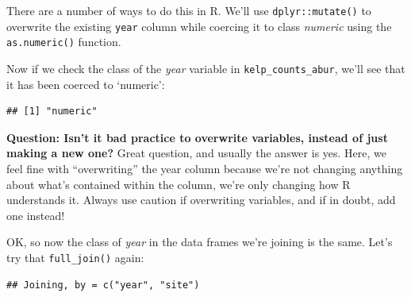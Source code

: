 \documentclass[]{book}
\newenvironment{Shaded}{\begin{snugshade}}{\end{snugshade}}
\newcommand{\CommentTok}[1]{\textcolor[rgb]{0.56,0.35,0.01}{\textit{#1}}}
\newcommand{\DataTypeTok}[1]{\textcolor[rgb]{0.13,0.29,0.53}{#1}}
\newcommand{\KeywordTok}[1]{\textcolor[rgb]{0.13,0.29,0.53}{\textbf{#1}}}
\newcommand{\NormalTok}[1]{#1}
\newcommand{\OperatorTok}[1]{\textcolor[rgb]{0.81,0.36,0.00}{\textbf{#1}}}
\newcommand{\StringTok}[1]{\textcolor[rgb]{0.31,0.60,0.02}{#1}}
\begin{document}
There are a number of ways to do this in R. We'll use \texttt{dplyr::mutate()} to overwrite the existing \texttt{year} column while coercing it to class \emph{numeric} using the \texttt{as.numeric()} function.

\begin{Shaded}
\end{Shaded}

Now if we check the class of the \emph{year} variable in \texttt{kelp\_counts\_abur}, we'll see that it has been coerced to `numeric':

\begin{Shaded}
\end{Shaded}

\begin{verbatim}
## [1] "numeric"
\end{verbatim}

\textbf{Question: Isn't it bad practice to overwrite variables, instead of just making a new one?} Great question, and usually the answer is yes. Here, we feel fine with ``overwriting'' the year column because we're not changing anything about what's contained within the column, we're only changing how R understands it. Always use caution if overwriting variables, and if in doubt, add one instead!

OK, so now the class of \emph{year} in the data frames we're joining is the same. Let's try that \texttt{full\_join()} again:

\begin{Shaded}
\end{Shaded}

\begin{verbatim}
## Joining, by = c("year", "site")
\end{verbatim}
\end{document}
